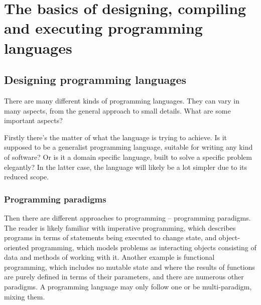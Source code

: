 \chapter{The basics of designing, compiling and executing programming languages}


    \section{Designing programming languages}
    
		
		There are many different kinds of programming languages. They can vary in many aspects, from the general approach to small details. What are some important aspects?
		
		Firstly there's the matter of what the language is trying to achieve. Is it supposed to be a generalist programming language, suitable for writing any kind of software? Or is it a domain specific language, built to solve a specific problem elegantly? In the latter case, the language will likely be a lot simpler due to its reduced scope.
		
		\subsection{Programming paradigms}
		Then there are different approaches to programming -- programming paradigms. The reader is likely familiar with imperative programming, which describes programs in terms of statements being executed to change state, and object-oriented programming, which models problems as interacting objects consisting of data and methods of working with it. Another example is functional programming, which includes no mutable state and where the results of functions are purely defined in terms of their parameters, and there are numerous other paradigms. A programming language may only follow one or be multi-paradigm, mixing them.
		
